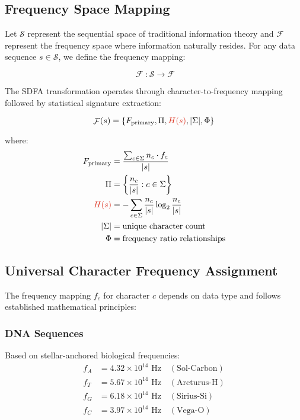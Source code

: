 \documentclass[journal]{IEEEtran}
\newcommand{\sdfa}{\textsc{SDFA}}
\newcommand{\entropy}[1]{\textcolor{entropyred}{H(#1)}}
\newcommand{\freqspace}{\mathcal{F}}
\newcommand{\seqspace}{\mathcal{S}}
\DeclareMathOperator{\FreqMap}{\mathcal{F}}
\begin{document}
\subsection{Frequency Space Mapping}

Let $\seqspace$ represent the sequential space of traditional information theory and $\freqspace$ represent the frequency space where information naturally resides. For any data sequence $s \in \seqspace$, we define the frequency mapping:

\begin{equation}
\FreqMap: \seqspace \rightarrow \freqspace
\end{equation}

The \sdfa{} transformation operates through character-to-frequency mapping followed by statistical signature extraction:

\begin{equation}
\FreqMap(s) = \left\{ F_{\text{primary}}, \Pi, \entropy{s}, |\Sigma|, \Phi \right\}
\end{equation}

where:
\begin{align}
F_{\text{primary}} &= \frac{\sum_{c \in \Sigma} n_c \cdot f_c}{|s|} \\
\Pi &= \left\{ \frac{n_c}{|s|} : c \in \Sigma \right\} \\
\entropy{s} &= -\sum_{c \in \Sigma} \frac{n_c}{|s|} \log_2 \frac{n_c}{|s|} \\
|\Sigma| &= \text{unique character count} \\
\Phi &= \text{frequency ratio relationships}
\end{align}

\subsection{Universal Character Frequency Assignment}

The frequency mapping $f_c$ for character $c$ depends on data type and follows established mathematical principles:

\subsubsection{DNA Sequences}
Based on stellar-anchored biological frequencies:
\begin{align}
f_A &= 4.32 \times 10^{14} \text{ Hz} \quad (\text{Sol-Carbon}) \\
f_T &= 5.67 \times 10^{14} \text{ Hz} \quad (\text{Arcturus-H}) \\
f_G &= 6.18 \times 10^{14} \text{ Hz} \quad (\text{Sirius-Si}) \\  
f_C &= 3.97 \times 10^{14} \text{ Hz} \quad (\text{Vega-O})
\end{align}
\end{document}
